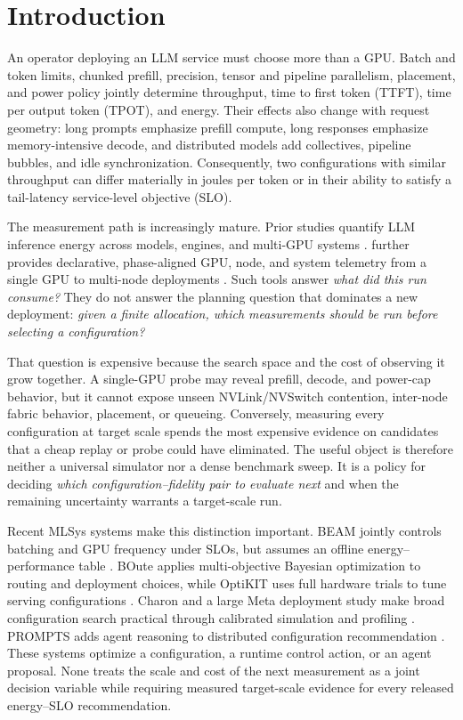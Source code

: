 \section{Introduction}

An operator deploying an LLM service must choose more than a GPU.  Batch and
token limits, chunked prefill, precision, tensor and pipeline parallelism,
placement, and power policy jointly determine throughput, time to first token
(TTFT), time per output token (TPOT), and energy.  Their effects also change
with request geometry: long prompts emphasize prefill compute, long responses
emphasize memory-intensive decode, and distributed models add collectives,
pipeline bubbles, and idle synchronization.  Consequently, two configurations
with similar throughput can differ materially in joules per token or in their
ability to satisfy a tail-latency service-level objective (SLO).

The measurement path is increasingly mature.  Prior studies quantify LLM
inference energy across models, engines, and multi-GPU systems
\cite{samsi2023words,niu2025engines,fernandez2025energy}.  \bench{} further
provides declarative, phase-aligned GPU, node, and system telemetry from a
single GPU to multi-node deployments \cite{niu2026tokenpowerbench}.  Such tools
answer \emph{what did this run consume?}  They do not answer the planning
question that dominates a new deployment: \emph{given a finite allocation,
which measurements should be run before selecting a configuration?}

That question is expensive because the search space and the cost of observing
it grow together.  A single-GPU probe may reveal prefill, decode, and power-cap
behavior, but it cannot expose unseen NVLink/NVSwitch contention, inter-node
fabric behavior, placement, or queueing.  Conversely, measuring every
configuration at target scale spends the most expensive evidence on candidates
that a cheap replay or probe could have eliminated.  The useful object is
therefore neither a universal simulator nor a dense benchmark sweep.  It is a
policy for deciding \emph{which configuration--fidelity pair to evaluate next}
and when the remaining uncertainty warrants a target-scale run.

Recent MLSys systems make this distinction important.  BEAM jointly controls
batching and GPU frequency under SLOs, but assumes an offline energy--performance
table \cite{lee2026beam}.  BOute applies multi-objective Bayesian optimization
to routing and deployment choices, while OptiKIT uses full hardware trials to
tune serving configurations \cite{jiang2026boute,santavas2026optikit}.  Charon
and a large Meta deployment study make broad configuration search practical
through calibrated simulation and profiling \cite{yang2026charon,cho2026deployment}.
PROMPTS adds agent reasoning to distributed configuration recommendation
\cite{ding2026prompts}.  These systems optimize a configuration, a runtime
control action, or an agent proposal.  None treats the scale and cost of the
next measurement as a joint decision variable while requiring measured
target-scale evidence for every released energy--SLO recommendation.

